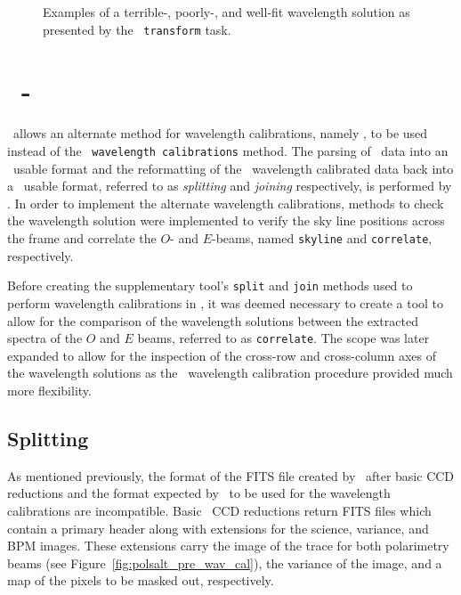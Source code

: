 \begin{figure}[t]
    \centering
    \caption{Examples of a terrible-, poorly-, and well-fit wavelength solution as presented by the \iraf\ \texttt{transform} task.}
    \label{fig:iraf_tran_eg}
\end{figure}

\section[\stops]{\stops\ - } \label{sec:stops}

\stops\ allows an alternate method for wavelength calibrations, namely \iraf, to be used instead of the \polsalt\ \texttt{wavelength calibrations} method. The parsing of \polsalt\ data into an \iraf\ usable format and the reformatting of the \iraf\ wavelength calibrated data back into a \polsalt\ usable format, referred to as \textit{splitting} and \textit{joining} respectively, is performed by \stops. In order to implement the alternate wavelength calibrations, methods to check the wavelength solution were implemented to verify the sky line positions across the frame and correlate the $O$- and $E$-beams, named \texttt{skyline} and \texttt{correlate}, respectively.

Before creating the supplementary tool's \texttt{split} and \texttt{join} methods used to perform wavelength calibrations in \iraf, it was deemed necessary to create a tool to allow for the comparison of the wavelength solutions between the extracted spectra of the $O$ and $E$ beams, referred to as \texttt{correlate}. The scope was later expanded to allow for the inspection of the cross-row and cross-column axes of the wavelength solutions as the \iraf\ wavelength calibration procedure provided much more flexibility.

\subsection{Splitting}



As mentioned previously, the format of the \gls{FITS} file created by \polsalt\ after basic \gls{CCD} reductions and the format expected by \iraf\ to be used for the wavelength calibrations are incompatible. Basic \polsalt\ \gls{CCD} reductions return \gls{FITS} files which contain a primary header along with extensions for the science, variance, and \gls{BPM} images. These extensions carry the image of the trace for both polarimetry beams (see Figure~\ref{fig:polsalt_pre_wav_cal}), the variance of the image, and a map of the pixels to be masked out, respectively.

